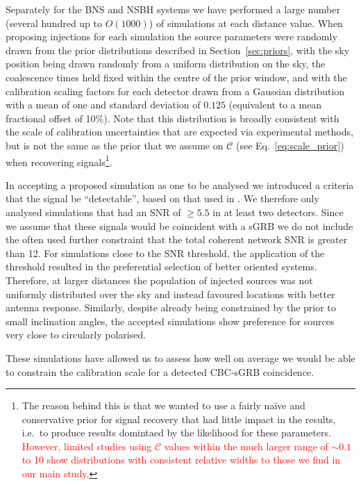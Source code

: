 \documentclass[prd, twocolumn, lengthcheck, superscriptaddress, showpacs, letterpaper, nofootinbib]{revtex4-1}
\newcommand{\scf}{\ensuremath{\mathcal{C}}}
\newcommand{\refresp}[1]{\textcolor{red}{#1}}
\begin{document}
Separately for the \ac{BNS} and \ac{NSBH} systems we have performed a large
number (several hundred up to $O(1000)$) of simulations at each distance value.
When proposing injections for each simulation the source parameters were
randomly drawn from the prior distributions described in
Section~\ref{sec:priors}, with the sky position being drawn randomly from a
uniform distribution on the sky, the coalescence times held fixed within the
centre of the prior window, and with the calibration scaling factors for each
detector drawn from a Gaussian distribution with a mean of one and standard
deviation of $0.125$ (equivalent to a mean fractional offset of 10\%).  Note
that this distribution is broadly consistent with the scale of calibration
uncertainties that are expected via experimental methods, but is not the same as
the prior that we assume on $\scf$ (see Eq.~\ref{eq:scale_prior}) when recovering 
signals\footnote{The reason behind this is that we wanted to use a fairly na\"{i}ve and
conservative prior for signal recovery that had little impact in the results, i.e.\
to produce results domintaed by the likelihood for these parameters. \refresp{However,
limited studies using $\scf$ values within the much larger range of
$\sim 0.1$ to 10 show distributions with consistent relative widths to
those we find in our main study.}}. 

In accepting a proposed simulation as one to be analysed we introduced a
criteria that the signal be ``detectable'', based on that used in
\cite{2012PhRvD..85h2002A}. We therefore only analysed simulations that had an
\ac{SNR} of $\geq 5.5$ in at least two detectors. Since we assume that these
signals would be coincident with a \ac{sGRB} we do not include the often used
further constraint that the total coherent network \ac{SNR} is greater than 12.
For simulations close to the \ac{SNR} threshold, the application of the
threshold resulted in the preferential selection of better oriented systems.
Therefore, at larger distances the population of injected
sources was not uniformly distributed over the sky and instead favoured locations with better
antenna response.  Similarly, despite already being constrained by the prior to
small inclination angles, the accepted simulations show preference for sources
very close to circularly polarised.

These simulations have allowed us to assess how well on average we would be
able to constrain the calibration scale for a detected \ac{CBC}-\ac{sGRB}
coincidence.
\end{document}
